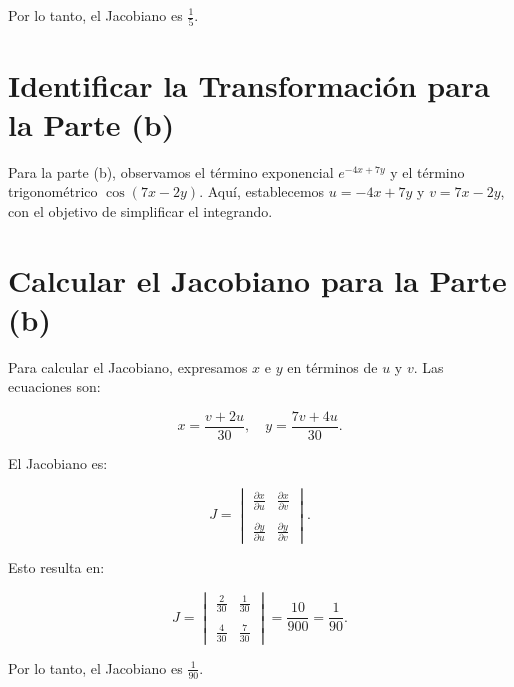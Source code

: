 Por lo tanto, el Jacobiano es \(\frac{1}{5}\).

\section*{Identificar la Transformación para la Parte (b)}

Para la parte (b), observamos el término exponencial \(e^{-4x+7y}\) y el término trigonométrico \(\cos(7x - 2y)\). Aquí, establecemos \(u = -4x + 7y\) y \(v = 7x - 2y\), con el objetivo de simplificar el integrando.

\section*{Calcular el Jacobiano para la Parte (b)}

Para calcular el Jacobiano, expresamos \(x\) e \(y\) en términos de \(u\) y \(v\). Las ecuaciones son:

\[
x = \frac{v + 2u}{30}, \quad y = \frac{7v + 4u}{30}.
\]

El Jacobiano es:

\[
J = 
\begin{vmatrix}
\frac{\partial x}{\partial u} & \frac{\partial x}{\partial v} \\\\
\frac{\partial y}{\partial u} & \frac{\partial y}{\partial v}
\end{vmatrix}.
\]

Esto resulta en:

\[
J = 
\begin{vmatrix}
\frac{2}{30} & \frac{1}{30} \\\\
\frac{4}{30} & \frac{7}{30}
\end{vmatrix}
= \frac{10}{900} = \frac{1}{90}.
\]

Por lo tanto, el Jacobiano es \(\frac{1}{90}\).
